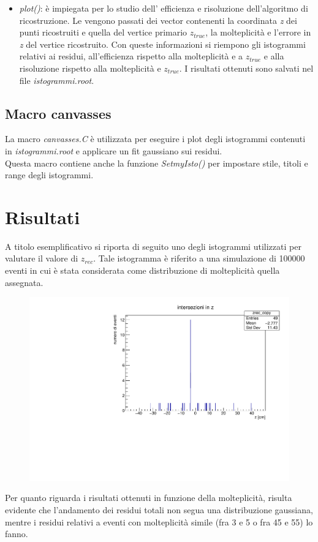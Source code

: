 \documentclass{article}
\begin{document}
\begin{itemize}
	\item \textit{plot()}: è impiegata per lo studio dell' efficienza e risoluzione dell'algoritmo di ricostruzione. Le vengono passati dei vector contenenti la coordinata \textit{z} dei punti ricostruiti e quella del vertice primario $z_{true}$, la molteplicità e l'errore in \textit{z} del vertice ricostruito. Con queste informazioni si riempono gli istogrammi relativi ai residui, all'efficienza rispetto alla molteplicità e a $z_{true}$ e alla risoluzione rispetto alla molteplicità e $z_{true}$. I risultati ottenuti sono salvati nel file \textit{istogrammi.root}. 
\end{itemize}

\subsection{Macro canvasses}
La macro \textit{canvasses.C} è utilizzata per eseguire i plot degli istogrammi contenuti in \textit{istogrammi.root} e applicare un fit gaussiano sui residui. 
\\
Questa macro contiene anche la funzione \textit{SetmyIsto()} per impostare stile, titoli e range degli istogrammi.

\newpage
\section{Risultati}
A titolo esemplificativo si riporta di seguito uno degli istogrammi utilizzati per valutare il valore di $z_{rec}$. Tale istogramma è riferito a una simulazione di 100000 eventi in cui è stata considerata come distribuzione di molteplicità quella assegnata.
\begin{figure}[H]
	\centering
	\includegraphics[scale=0.35]{istofuncintersezioni}
\end{figure}
\noindent
Per quanto riguarda i risultati ottenuti in funzione della molteplicità, risulta evidente che l'andamento dei residui totali non segua una distribuzione gaussiana, mentre i residui relativi a eventi con molteplicità simile (fra 3 e 5 o fra 45 e 55) lo fanno.
\end{document}
